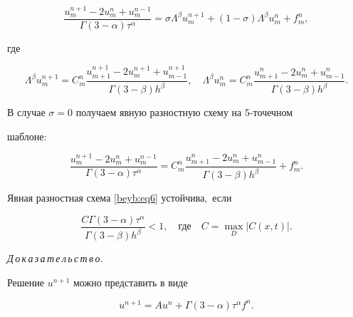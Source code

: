 \begin{equation}

\label{beyb:eq5}

\frac{u_m^{n+1} -2u_m^n +u_m^{n-1}}{\Gamma

(3-\alpha )\tau^\alpha}=\sigma  \Lambda^\beta u_m^{n+1}

+(1-\sigma )\Lambda^\beta u_m^n +f_m^n,

\end{equation}

где

$$

\Lambda^\beta u_m^{n+1} =C_m^n \frac{u_{m+1}^{n+1} -2u_m^{n+1}

+u_{m-1}^{n+1}}{\Gamma (3-\beta )h^\beta},\quad

\Lambda^\beta u_m^n =C_m^n

\frac{u_{m+1}^n -2u_m^n +u_{m-1}^n }{\Gamma (3-\beta )h^\beta}.

$$



В случае $\sigma =0$ получаем явную разностную схему на 5-точечном

шаблоне:

\begin{equation}

\label{beyb:eq6} \frac{u_m^{n+1} -2u_m^n +u_m^{n-1} }{\Gamma

(3-\alpha )\tau ^\alpha }=C_m^n \frac{u_{m+1}^n -2u_m^n +u_{m-1}^n

}{\Gamma (3-\beta )h^\beta }+f_m^n  .

\end{equation}



\begin{theorem}[1]Явная разностная схема \eqref{beyb:eq6} устойчива$,$ если

$$

\frac{C\Gamma (3-\alpha )\tau^\alpha }{\Gamma (3-\beta )h^\beta }<1, \quad \text{где} \quad  C=\max\limits_{D} |C(x, t)|.

$$

\end{theorem}



\smallskip

\textit{Д\,о\,к\,а\,з\,а\,т\,е\,л\,ь\,с\,т\,в\,о.}

Решение $u^{n+1}$ можно представить в виде

\[

u^{n+1}=Au^n+\Gamma (3-\alpha )\tau^\alpha f^n.

\]

